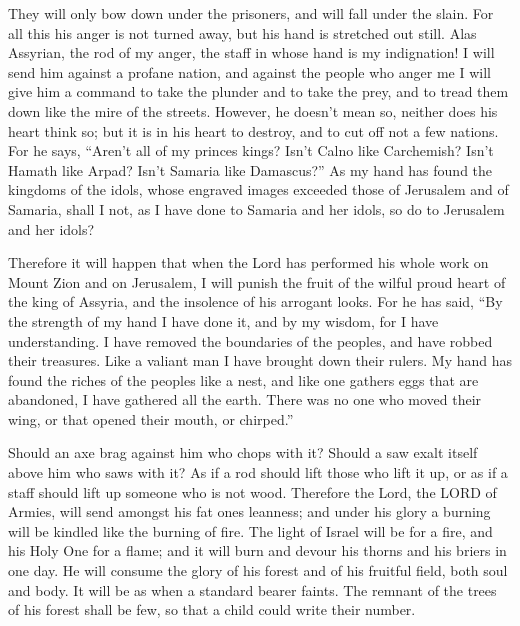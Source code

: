 They will only bow down under the prisoners, and will
fall under the slain. For all this his anger is not turned away, but his
hand is stretched out still.  Alas Assyrian, the rod of my
anger, the staff in whose hand is my indignation!  I will
send him against a profane nation, and against the people who anger me I
will give him a command to take the plunder and to take the prey, and to
tread them down like the mire of the streets.  However, he
doesn't mean so, neither does his heart think so; but it is in his heart
to destroy, and to cut off not a few nations.  For he
says, ``Aren't all of my princes kings?  Isn't Calno like
Carchemish? Isn't Hamath like Arpad? Isn't Samaria like Damascus?''
 As my hand has found the kingdoms of the idols, whose
engraved images exceeded those of Jerusalem and of Samaria,
 shall I not, as I have done to Samaria and her idols, so
do to Jerusalem and her idols?

 Therefore it will happen that when the Lord has
performed his whole work on Mount Zion and on Jerusalem, I will punish
the fruit of the wilful proud heart of the king of Assyria, and the
insolence of his arrogant looks.  For he has said, ``By
the strength of my hand I have done it, and by my wisdom, for I have
understanding. I have removed the boundaries of the peoples, and have
robbed their treasures. Like a valiant man I have brought down their
rulers.  My hand has found the riches of the peoples like
a nest, and like one gathers eggs that are abandoned, I have gathered
all the earth. There was no one who moved their wing, or that opened
their mouth, or chirped.''

 Should an axe brag against him who chops with it? Should
a saw exalt itself above him who saws with it? As if a rod should lift
those who lift it up, or as if a staff should lift up someone who is not
wood.  Therefore the Lord, the LORD of Armies, will send
amongst his fat ones leanness; and under his glory a burning will be
kindled like the burning of fire.  The light of Israel
will be for a fire, and his Holy One for a flame; and it will burn and
devour his thorns and his briers in one day.  He will
consume the glory of his forest and of his fruitful field, both soul and
body. It will be as when a standard bearer faints.  The
remnant of the trees of his forest shall be few, so that a child could
write their number.

